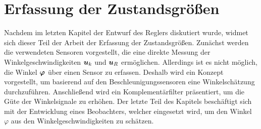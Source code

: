 \ifx\FORMAT\undefined


\fi

\chapter{Erfassung der Zustandsgrößen}\label{chapter_Sensorik}
Nachdem im letzten Kapitel der Entwurf des Reglers diskutiert wurde, widmet sich dieser Teil der Arbeit der Erfassung der Zustandsgrößen. Zunächst werden die verwendeten Sensoren vorgestellt, die eine direkte Messung der Winkelgeschwindigkeiten $\boldsymbol{u}_k$ und $\boldsymbol{u}_R$ ermöglichen. Allerdings ist es nicht möglich, die Winkel $\boldsymbol{\varphi}$ über einen Sensor zu erfassen. Deshalb wird ein Konzept vorgestellt, um basierend auf den Beschleunigungssensoren eine Winkelschätzung durchzuführen. Anschließend wird ein Komplementärfilter präsentiert, um die Güte der Winkelsignale zu erhöhen. Der letzte Teil des Kapitels beschäftigt sich mit der Entwicklung eines Beobachters, welcher eingesetzt wird, um den Winkel $\varphi$ aus den Winkelgeschwindigkeiten zu schätzen.
\newpage

\newpage

\newpage

\newpage



\ifx\FORMAT\undefined

\fi
